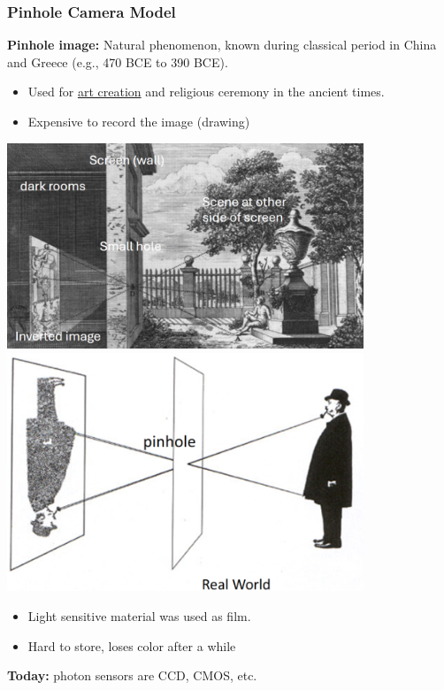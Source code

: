 \documentclass[10pt]{article}
\begin{document}
\subsubsection*{Pinhole Camera Model}
\textbf{Pinhole image:} Natural phenomenon, known during classical period in China and Greece (e.g., 470 BCE to 390 BCE).  
\begin{itemize}
    \item Used for \underline{art creation} and religious ceremony in the ancient times.
	\item Expensive to record the image (drawing)
\end{itemize}
\begin{center} 
	\includegraphics*[width=0.8\textwidth]{L1_7.png} \\
    \includegraphics*[width=0.8\textwidth]{L1_8.png} 
\end{center}
\begin{itemize}
	\item Light sensitive material was used as film.  
	\item Hard to store, loses color after a while
\end{itemize}
\textbf{Today:} photon sensors are CCD, CMOS, etc.
\end{document}
